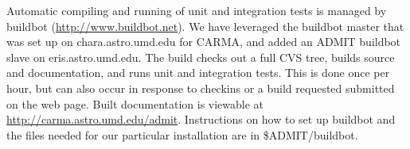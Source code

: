 \documentclass[10pt]{article}
\begin{document}
Automatic compiling and running of unit and integration tests is
managed by buildbot (\url{http://www.buildbot.net}).  We have leveraged
the buildbot master that was set up on chara.astro.umd.edu for CARMA, 
and added an ADMIT buildbot slave on eris.astro.umd.edu.  The build
checks out a full CVS tree, builds source and documentation, and
runs unit and integration tests.  This is done once per hour, but
can also occur in response to checkins or a build requested submitted
on the web page.  Built documentation is viewable at \url{http://carma.astro.umd.edu/admit}.
Instructions on how to set up buildbot and the files needed for our
particular installation are in \$ADMIT/buildbot.
\end{document}
